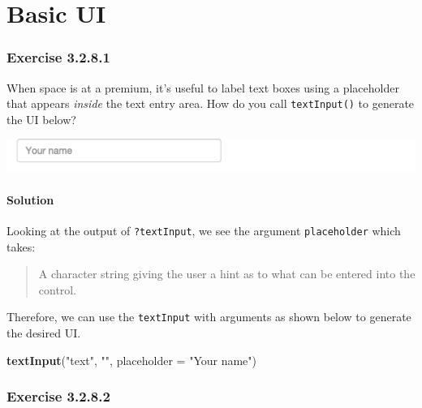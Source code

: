 \documentclass[]{book}
\newenvironment{Shaded}{\begin{snugshade}}{\end{snugshade}}
\newcommand{\DataTypeTok}[1]{\textcolor[rgb]{0.13,0.29,0.53}{#1}}
\newcommand{\KeywordTok}[1]{\textcolor[rgb]{0.13,0.29,0.53}{\textbf{#1}}}
\newcommand{\NormalTok}[1]{#1}
\newcommand{\StringTok}[1]{\textcolor[rgb]{0.31,0.60,0.02}{#1}}
\begin{document}
\hypertarget{basic-ui}{%
\chapter{Basic UI}\label{basic-ui}}

\hypertarget{exercise-3.2.8.1}{%
\subsection*{Exercise 3.2.8.1}\label{exercise-3.2.8.1}}

When space is at a premium, it's useful to label text boxes using a placeholder that appears \emph{inside} the text entry area. How do you call \texttt{textInput()} to
generate the UI below?

\includegraphics{images/placeholder.png}

\begin{solution}

\hypertarget{solution}{%
\subsubsection*{Solution}\label{solution}}

Looking at the output of \texttt{?textInput}, we see the argument \texttt{placeholder} which
takes:

\begin{quote}
A character string giving the user a hint as to what can be entered into
the control.
\end{quote}

Therefore, we can use the \texttt{textInput} with arguments as shown below to generate
the desired UI.

\begin{Shaded}
\begin{Highlighting}[]
\KeywordTok{textInput}\NormalTok{(}\StringTok{"text"}\NormalTok{, }\StringTok{""}\NormalTok{, }\DataTypeTok{placeholder =} \StringTok{"Your name"}\NormalTok{)}
\end{Highlighting}
\end{Shaded}

\end{solution}

\hypertarget{exercise-3.2.8.2}{%
\subsection*{Exercise 3.2.8.2}\label{exercise-3.2.8.2}}
\end{document}
